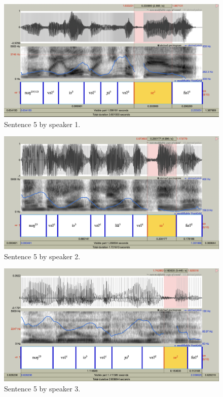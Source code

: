 \documentclass[11pt]{article}
\begin{document}
\begin{figure}[H]
    \centering
    \includegraphics[width=0.6\paperwidth]{s5_sp1.png}
    \caption{Sentence 5 by speaker 1.\label{fig:s5_sp1}}
\end{figure}

\begin{figure}[H]
    \centering
    \includegraphics[width=0.6\paperwidth]{s5_sp2.png}
    \caption{Sentence 5 by speaker 2.\label{fig:s5_sp2}}
\end{figure}

\begin{figure}[H]
    \centering
    \includegraphics[width=0.6\paperwidth]{s5_sp3.png}
    \caption{Sentence 5 by speaker 3.\label{fig:s5_sp3}}
\end{figure}
\end{document}
